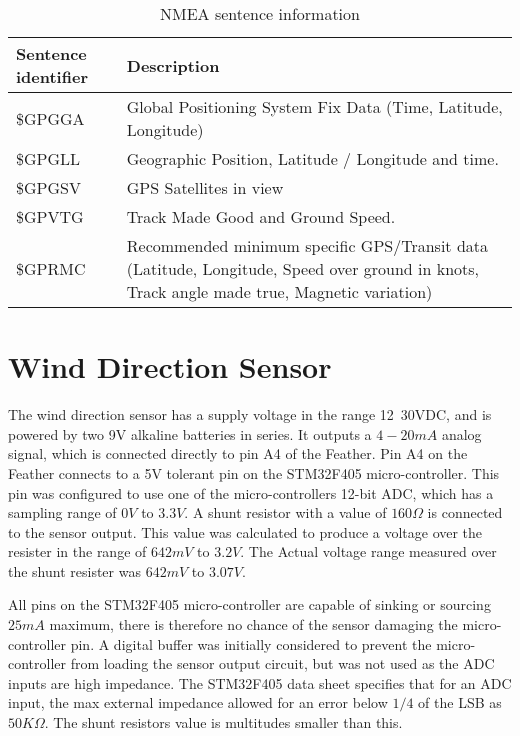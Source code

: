 \begin{table}[!h]
    \centering
    \caption{NMEA sentence information}
    \label{table:NMEA}
    \begin{tabular}{ | m{10em} | m{25em} | }
        
        \hline
        \textbf{Sentence identifier} & \textbf{Description} \\
        \hline
        \$GPGGA & Global Positioning System Fix Data (Time, Latitude, Longitude) \\
        \hline
        \$GPGLL & Geographic Position, Latitude / Longitude and time. \\
        \hline
        \$GPGSV & GPS Satellites in view \\
        \hline
        \$GPVTG & Track Made Good and Ground Speed. \\
        \hline
        \$GPRMC & Recommended minimum specific GPS/Transit data (Latitude, Longitude, Speed over ground in knots, Track angle made true, Magnetic variation) \\
        \hline
    \end{tabular}
\end{table}


\section{Wind Direction Sensor}
The wind direction sensor has a supply voltage in the range 12~30VDC, and is powered by two 9V alkaline batteries in series. It outputs a $4-20mA$ analog signal,
which is connected directly to pin A4 of the Feather. Pin A4 on the Feather connects to a 5V tolerant pin on the STM32F405 micro-controller. This pin was 
configured to use one of the micro-controllers 12-bit ADC, which has a sampling range of $0V$ to $3.3V$. A shunt resistor with a value of $160\Omega$ is 
connected to the sensor output. This value was calculated to produce a voltage over the resister in the range of $642mV$ to $3.2V$. The Actual voltage range
measured over the shunt resister was $642mV$ to $3.07V$.

All pins on the STM32F405 micro-controller are capable of sinking or sourcing $25mA$ maximum, there is therefore no chance of the sensor damaging the micro-controller
pin. A digital buffer was initially considered to prevent the micro-controller from loading the sensor output circuit, but was not used as the ADC inputs are
high impedance. The STM32F405 data sheet\cite{STM32F405} specifies that for an ADC input, the max external impedance allowed for an error below $1/4$ of the LSB as $50K\Omega$. 
The shunt resistors value is multitudes smaller than this.     

